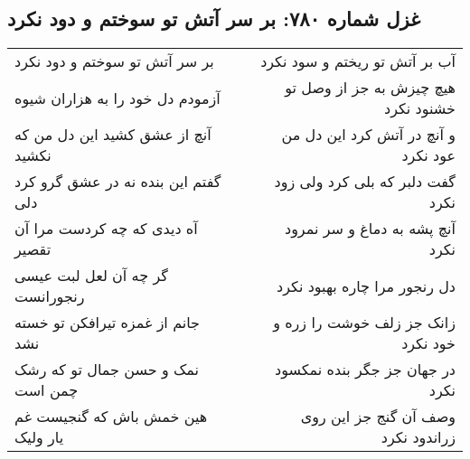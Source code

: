 \begin{center}
\section*{غزل شماره ۷۸۰: بر سر آتش تو سوختم و دود نکرد}
\label{sec:0780}
\begin{longtable}{l p{0.5cm} r}
بر سر آتش تو سوختم و دود نکرد
&&
آب بر آتش تو ریختم و سود نکرد
\\
آزمودم دل خود را به هزاران شیوه
&&
هیچ چیزش به جز از وصل تو خشنود نکرد
\\
آنچ از عشق کشید این دل من که نکشید
&&
و آنچ در آتش کرد این دل من عود نکرد
\\
گفتم این بنده نه در عشق گرو کرد دلی
&&
گفت دلبر که بلی کرد ولی زود نکرد
\\
آه دیدی که چه کردست مرا آن تقصیر
&&
آنچ پشه به دماغ و سر نمرود نکرد
\\
گر چه آن لعل لبت عیسی رنجورانست
&&
دل رنجور مرا چاره بهبود نکرد
\\
جانم از غمزه تیرافکن تو خسته نشد
&&
زانک جز زلف خوشت را زره و خود نکرد
\\
نمک و حسن جمال تو که رشک چمن است
&&
در جهان جز جگر بنده نمکسود نکرد
\\
هین خمش باش که گنجیست غم یار ولیک
&&
وصف آن گنج جز این روی زراندود نکرد
\\
\end{longtable}
\end{center}
